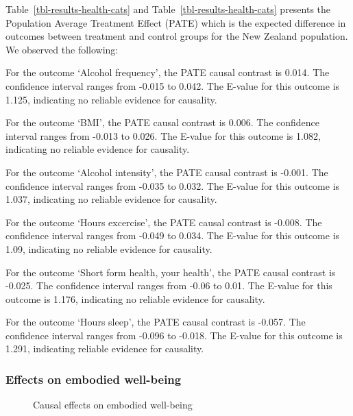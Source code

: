 \documentclass[
  singlecolumn,
  9pt]{article}
\begin{document}
Table~\ref{tbl-results-health-cats} and
Table~\ref{tbl-results-health-cats} presents the Population Average
Treatment Effect (PATE) which is the expected difference in outcomes
between treatment and control groups for the New Zealand population. We
observed the following:

For the outcome `Alcohol frequency', the PATE causal contrast is 0.014.
The confidence interval ranges from -0.015 to 0.042. The E-value for
this outcome is 1.125, indicating no reliable evidence for causality.

For the outcome `BMI', the PATE causal contrast is 0.006. The confidence
interval ranges from -0.013 to 0.026. The E-value for this outcome is
1.082, indicating no reliable evidence for causality.

For the outcome `Alcohol intensity', the PATE causal contrast is -0.001.
The confidence interval ranges from -0.035 to 0.032. The E-value for
this outcome is 1.037, indicating no reliable evidence for causality.

For the outcome `Hours excercise', the PATE causal contrast is -0.008.
The confidence interval ranges from -0.049 to 0.034. The E-value for
this outcome is 1.09, indicating no reliable evidence for causality.

For the outcome `Short form health, your health', the PATE causal
contrast is -0.025. The confidence interval ranges from -0.06 to 0.01.
The E-value for this outcome is 1.176, indicating no reliable evidence
for causality.

For the outcome `Hours sleep', the PATE causal contrast is -0.057. The
confidence interval ranges from -0.096 to -0.018. The E-value for this
outcome is 1.291, indicating reliable evidence for causality.

\newpage{}

\subsubsection{Effects on embodied
well-being}\label{effects-on-embodied-well-being}

\begin{figure}


\caption{\label{fig-results-embodied-cats}Causal effects on embodied
well-being}

\end{figure}%
\end{document}
